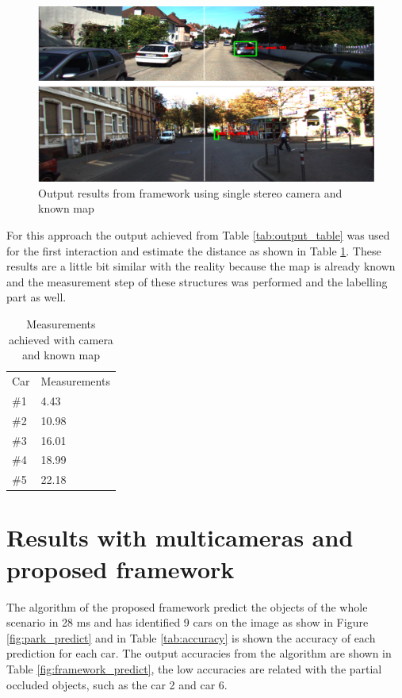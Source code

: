 \begin{figure}[H]
\centering
\includegraphics[width=\textwidth]{imagens/ouput.png}
\caption{Output results from framework using single stereo camera and known map}
\label{fig:output}
\end{figure}

For this approach the output achieved from Table \ref{tab:output_table} was used for the first interaction and estimate the distance as shown in Table \ref{tab:output_2}. These results are a little bit similar with the reality because the map is already known and the measurement step of these structures was performed and the labelling part as well.

\begin{table}[H]
\centering
\caption{Measurements achieved with camera and known map}
\begin{tabular}{l|l} 
\toprule
Car &  Measurements      \\
\#1   & 4.43        \\
\#2   & 10.98       \\
\#3   & 16.01       \\
\#4   & 18.99       \\
\#5   & 22.18       \\
\bottomrule
\end{tabular}
\label{tab:output_2}
\end{table} 


\section{Results with multicameras and proposed framework}


The algorithm of the proposed framework predict the objects of the whole scenario in 28 ms and has identified 9 cars on the image as show in Figure \ref{fig:park_predict} and in Table \ref{tab:accuracy} is shown the accuracy of each prediction for each car. The output accuracies from the algorithm are shown in Table \ref{fig:framework_predict}, the low accuracies are related with the partial occluded objects, such as the car 2 and car 6. 


